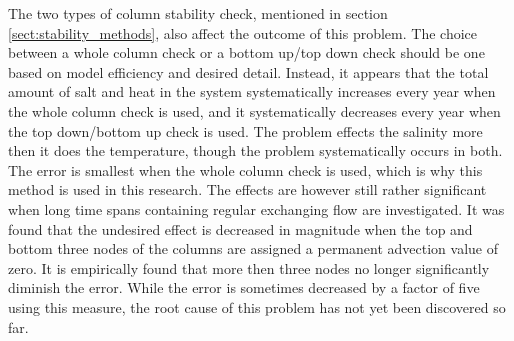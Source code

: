 \documentclass[twocolumn]{article}
\begin{document}
The two types of column stability check, mentioned in section \ref{sect:stability_methods}, also affect the outcome of this problem. The choice between a whole column check or a bottom up/top down check should be one based on model efficiency and desired detail. Instead, it appears that the total amount of salt and heat in the system systematically increases every year when the whole column check is used, and it systematically decreases every year when the top down/bottom up check is used. The problem effects the salinity more then it does the temperature, though the problem systematically occurs in both. 
The error is smallest when the whole column check is used, which is why this method is used in this research. The effects are however still rather significant when long time spans containing regular exchanging flow are investigated. It was found that the undesired effect is decreased in magnitude when the top and bottom three nodes of the columns are assigned a permanent advection value of zero. It is empirically found that more then three nodes no longer significantly diminish the error. While the error is sometimes decreased by a factor of five using this measure, the root cause of this problem has not yet been discovered so far. 
\end{document}
